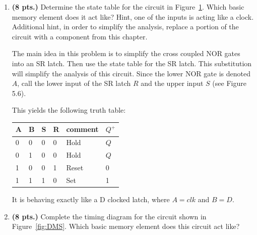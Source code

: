 \begin{enumerate}
\item {\bf (8 pts.)} Determine the state table for the circuit 
in Figure~\ref{fig:DLatch}.  Which basic memory element does it act 
like?  Hint, one of the inputs is acting like a clock.  Additional
hint, in order to simplify the analysis, replace a portion of the 
circuit with a component from this chapter.
\begin{figure}[ht]
\caption{}
\label{fig:DLatch}
\end{figure}

\begin{solution}{
The main idea in this problem is to simplify the cross coupled NOR gates into
an SR latch.  Then use the state table for the SR latch.  This substitution
will simplify the analysis of this circuit.  Since the lower NOR gate is denoted
$A$, call the lower input of the SR latch $R$ and the upper input $S$
(see Figure 5.6).

This yields the following truth table:

\begin{tabular}{l|l|l|l|l||l}
A & B & S & R & comment & $Q^+$ \\ \hline
0 & 0 & 0 & 0 & Hold    & $Q$   \\ \hline
0 & 1 & 0 & 0 & Hold    & $Q$   \\ \hline
1 & 0 & 0 & 1 & Reset   & 0     \\ \hline
1 & 1 & 1 & 0 & Set     & 1     \\ 
\end{tabular}

It is behaving exactly like a D clocked latch, where $A=clk$ and $B=D$.
} \end{solution}

\item {\bf (8 pts.)} Complete the timing diagram for the circuit 
shown in Figure~\ref{fig:DMS}.  Which basic memory element 
does this circuit act like? 


\end{enumerate}
